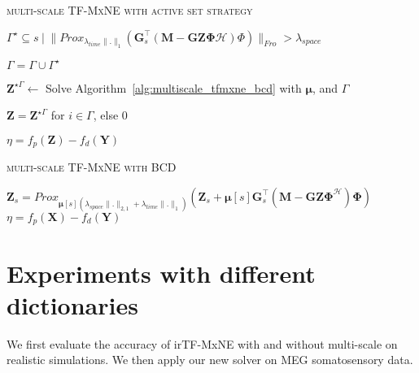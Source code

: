 {\fontsize{4}{4}\selectfont
\begin{algorithm}[t]
\caption{\textsc{multi-scale TF-MxNE with active set strategy}}
\While{
		$\eta \geq \epsilon$
	  }
	  {
	  	$\Gamma^\star \subseteq {s \hspace{3pt} | \hspace{3pt} \|Prox_{\lambda_{time}\|.\|_1}(\mathbf{G}_s^\top(\mathbf{M}-\mathbf{GZ\Phi}\mathcal{H})\Phi)\|_{Fro} > \lambda_{space} }$
	  	
	  	$\Gamma = \Gamma \cup \Gamma^\star$
	  	
	  	$\mathbf{Z}^{\star\Gamma}\leftarrow$ Solve Algorithm~\ref{alg:multiscale_tfmxne_bcd} with $\mathbf{\mu}$, and $\Gamma$
	  	
	  	$\mathbf{Z}=\mathbf{Z}^{\star\Gamma}$ for $i\in\Gamma$, else 0

	  	$\eta=f_p(\mathbf{Z})-f_d(\mathbf{Y})$
	  }
\label{alg:multiscale_tfmxne_activeset}
\end{algorithm}
}

{\fontsize{4}{4}\selectfont
\begin{algorithm}[t]
\caption{\textsc{multi-scale TF-MxNE with BCD}}
\While{
		$\eta \geq \epsilon$
	  }
	  {
	  		{
	  			$\mathbf{Z}_s = Prox_{\mathbf{\mu}[s](\lambda_{space}\|.\|_{2,1}+\lambda_{time}\|.\|_1)}(\mathbf{Z}_s+\mathbf{\mu}[s]\mathbf{G}^\top_s(\mathbf{M}-\mathbf{GZ\Phi}^\mathcal{H})\mathbf{\Phi})$
	  		}
	  	$\eta = f_p(\mathbf{X})-f_d(\mathbf{Y})$
	  }
\label{alg:multiscale_tfmxne_bcd}
\end{algorithm}
}


\section{Experiments with different dictionaries}
We first evaluate the accuracy of irTF-MxNE with and without multi-scale on realistic simulations. We then apply our new solver on MEG somatosensory data.

